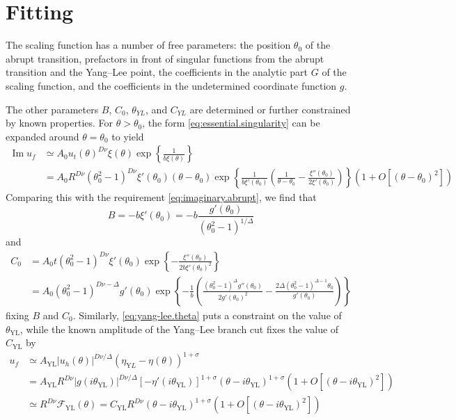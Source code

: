 \documentclass[
aps,
pre,
preprint,
longbibliography,
floatfix
]{revtex4-2}
\begin{document}
\section{Fitting}

The scaling function has a number of free parameters: the position $\theta_0$
of the abrupt transition, prefactors in front of singular functions from the
abrupt transition and the Yang--Lee point, the coefficients in the analytic
part $G$ of the scaling function, and the coefficients in the undetermined
coordinate function $g$.

The other parameters $B$, $C_0$, $\theta_{YL}$, and $C_{YL}$ are determined or
further constrained by known properties. For $\theta>\theta_0$, the form
\eqref{eq:essential.singularity} can be expanded around $\theta=\theta_0$ to
yield
\begin{equation}
  \begin{aligned}
    \operatorname{Im}u_f
    &\simeq A_0 u_t(\theta)^{D\nu}\xi(\theta)\exp\left\{\frac1{b\xi(\theta)}\right\} \\
    &=A_0R^{D\nu}(\theta_0^2-1)^{D\nu}\xi'(\theta_0)(\theta-\theta_0)
    \exp\left\{\frac1{b\xi'(\theta_0)}\left(\frac1{\theta-\theta_0}
      -\frac{\xi''(\theta_0)}{2\xi'(\theta_0)}\right)
      \right\}\left(1+O[(\theta-\theta_0)^2]\right)
  \end{aligned}
\end{equation}
Comparing this with the requirement \eqref{eq:imaginary.abrupt}, we find that
\begin{equation}
  B=-b\xi'(\theta_0)=-b\frac{g'(\theta_0)}{(\theta_0^2-1)^{1/\Delta}}
\end{equation}
and
\begin{equation}
  \begin{aligned}
    C_0&=A_0t(\theta_0^2-1)^{D\nu}\xi'(\theta_0)\exp\left\{
    -\frac{\xi''(\theta_0)}{2b\xi'(\theta_0)^2}
  \right\} \\
       &=
       A_0(\theta_0^2-1)^{D\nu-\Delta}g'(\theta_0)
       \exp\left\{-\frac1b\left(\frac{(\theta_0^2-1)^\Delta g''(\theta_0)}{2g'(\theta_0)^2}-\frac{2\Delta(\theta_0^2-1)^{\Delta - 1}\theta_0}{g'(\theta_0)}
       \right)\right\}
  \end{aligned}
\end{equation}
fixing $B$ and $C_0$. Similarly, \eqref{eq:yang-lee.theta} puts a constraint on
the value of $\theta_\mathrm{YL}$, while the known amplitude of the Yang--Lee
branch cut fixes the value of $C_\mathrm{YL}$ by
\begin{equation}
  \begin{aligned}
    u_f
    &\simeq A_\mathrm{YL}|u_h(\theta)|^{D\nu/\Delta}(\eta_{\mathrm YL}-\eta(\theta))^{1+\sigma} \\
    &=A_\mathrm{YL}R^{D\nu}|g(i\theta_\mathrm{YL})|^{D\nu/\Delta}[-\eta'(i\theta_\mathrm{YL})]^{1+\sigma}(\theta-i\theta_\mathrm{YL})^{1+\sigma}\left(1+O[(\theta-i\theta_\mathrm{YL})^2]\right)\\
    &\simeq R^{D\nu}\mathcal F_\mathrm{YL}(\theta)
    =C_\mathrm{YL}R^{D\nu}(\theta-i\theta_\mathrm{YL})^{1+\sigma}\left(1+O[(\theta-i\theta_\mathrm{YL})^2]\right)
\end{aligned}
\end{equation}
\end{document}
